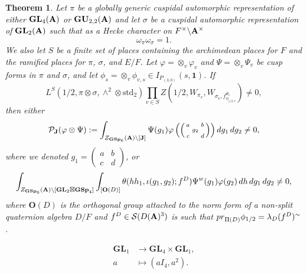 \documentclass[10pt,a4paper]{amsart}
\newtheorem{theorem}{Theorem}
\def\A{{\bf A}}
\def\GL{\mathbf{GL}}
\def\GSp{{\mathbf{GSp}}}
\def\GU{{\mathbf{GU}}}
\begin{document}
\begin{theorem}\label{Final:Theorem:Central:Value}
    Let $\pi$ be a globally generic cuspidal automorphic representation of either $\GL_4(\A)$ or $\GU_{2,2}(\A)$ and let $\sigma$ be a cuspidal automorphic representation of $\GL_2(\A)$ such that as a Hecke character on $F^\times \backslash \A^\times$ \begin{equation*}
    \omega_\pi \omega_\sigma = 1.
\end{equation*}
We also let $S$ be a finite set of places containing the archimedean places for $F$ and the ramified places for $\pi$, $\sigma$, and $E/F$. Let $\varphi = \otimes_v \varphi_v$ and $\Psi = \otimes_v \Psi_v$ be cusp forms in $\pi$ and $\sigma$, and let  $\phi_{s} = \otimes_v \phi_{v,s} \in I_{P_{(3,0)}}(s,\mathbf{1})$. If 
$$ L^S(1/2, \pi \otimes \sigma, \wedge^2 \otimes  \mathrm{std}_2) \prod_{v \in S} Z\left(1/2,W_{\pi_v}, W_{\sigma_v,f_{\phi_{1/2,v}}^{\Psi_v}} \right) \ne 0,$$ then either 
\begin{align}
\mathcal{P}_{\mathbf{J}}( \varphi \otimes \Psi) : = \int_{Z_{\GSp_6}(\A)  \backslash[ \mathbf{J}]} \Psi(g_1) \varphi\left( \left(\begin{smallmatrix}
    a& &b\\ &g_2& \\ c& &d
\end{smallmatrix}\right) \right )  dg_1 \, dg_2 \ne 0,  
\end{align}
 where we denoted $g_1 = \left(\begin{smallmatrix}a&b\\c&d\end{smallmatrix}\right)$, or 
\begin{align}\label{FormulaWithTheta}
    \int_{Z_{\GSp_6}(\A)\backslash [\GL_2\boxtimes \GSp_4]} \int_{[\mathbf{O}(D)]} \theta(h h_1, \iota( g_1  , g_2) ; f^D) \Psi^w( g_1 ) \varphi(g_2) \, d h \, dg_1\,dg_2 \ne 0,
\end{align}
where $\mathbf{O}(D)$ is the orthogonal group attached to the norm form of a non-split quaternion algebra $D/F$ and $f^D \in \mathcal{S}(D(\A)^3)$ is such that ${\rm pr}_{\Pi(D)} \phi_{1/2}  = \lambda_D(f^D)^{\sim}$. 
\end{theorem}

\begin{align}
    \label{Embedding:GL1}\GL_1&\to \GL_4\times \GL_1,\\
    a&\mapsto (aI_4,a^2).\nonumber
\end{align}
\end{document}
